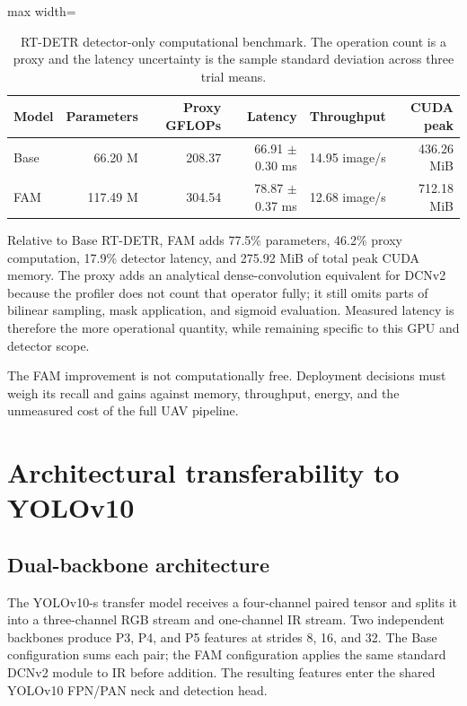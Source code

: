 \begin{table}[htbp]
  \centering
  \caption{RT-DETR detector-only computational benchmark. The operation count is a
  proxy and the latency uncertainty is the sample standard deviation across
  three trial means.}
  \label{tab:compute-results}
  \begin{adjustbox}{max width=\textwidth}
  \begin{tabular}{lrrrrr}
    \toprule
    Model & Parameters & Proxy GFLOPs & Latency & Throughput & CUDA peak \\
    \midrule
    Base & 66.20 M & 208.37 & 66.91 \(\pm\) 0.30 ms & 14.95 image/s & 436.26 MiB \\
    FAM & 117.49 M & 304.54 & 78.87 \(\pm\) 0.37 ms & 12.68 image/s & 712.18 MiB \\
    \bottomrule
  \end{tabular}
  \end{adjustbox}
\end{table}

Relative to Base RT-DETR, FAM adds 77.5\% parameters, 46.2\% proxy computation,
17.9\% detector latency, and 275.92 MiB of total peak CUDA memory. The proxy
adds an analytical dense-convolution equivalent for DCNv2 because the profiler
does not count that operator fully; it still omits parts of bilinear sampling,
mask application, and sigmoid evaluation. Measured latency is therefore the
more operational quantity, while remaining specific to this GPU and detector
scope.

The FAM improvement is not computationally free. Deployment decisions must
weigh its recall and \mapfifty{} gains against memory, throughput, energy, and
the unmeasured cost of the full UAV pipeline.

\section{Architectural transferability to YOLOv10}
\label{sec:yolo-transfer}

\subsection{Dual-backbone architecture}

The YOLOv10-s transfer model receives a four-channel paired tensor and splits
it into a three-channel RGB stream and one-channel IR stream. Two independent
backbones produce P3, P4, and P5 features at strides 8, 16, and 32. The
Base configuration sums each pair; the FAM configuration applies the same
standard DCNv2 module to IR before addition. The resulting features enter the
shared YOLOv10 FPN/PAN neck and detection head.

